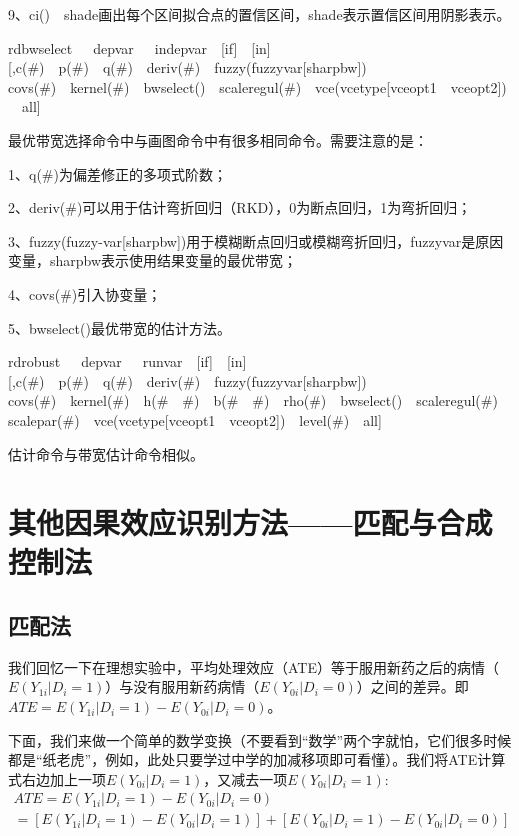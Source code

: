 \documentclass[cn,10pt,math=newtx,citestyle=gb7714-2015,bibstyle=gb7714-2015]{elegantbook}
\begin{document}
	9、ci()~~shade画出每个区间拟合点的置信区间，shade表示置信区间用阴影表示。
	
	rdbwselect~~~depvar~~~indepvar~~[if]~~[in][,c(\#)~~p(\#)~~q(\#)~~deriv(\#)~~fuzzy(fuzzyvar[sharpbw])~~\\
	covs(\#)~~kernel(\#)~~bwselect()~~scaleregul(\#)~~vce(vcetype[vceopt1~~vceopt2])~~all]
	
	最优带宽选择命令中与画图命令中有很多相同命令。需要注意的是：
	
	1、q(\#)为偏差修正的多项式阶数；
	
	2、deriv(\#)可以用于估计弯折回归（RKD），0为断点回归，1为弯折回归；
	
	3、fuzzy(fuzzy-var[sharpbw])用于模糊断点回归或模糊弯折回归，fuzzyvar是原因变量，sharpbw表示使用结果变量的最优带宽；
	
	4、covs(\#)引入协变量；
	
	5、bwselect()最优带宽的估计方法。
	
	rdrobust~~~depvar~~~runvar~~[if]~~[in][,c(\#)~~p(\#)~~q(\#)~~deriv(\#)~~fuzzy(fuzzyvar[sharpbw])~~\\
	covs(\#)~~kernel(\#)~~h(\#~~\#)~~b(\#~~\#)~~rho(\#)~~bwselect()~~scaleregul(\#)~~\\
	scalepar(\#)~~vce(vcetype[vceopt1~~vceopt2])~~level(\#)~~all]
	
	估计命令与带宽估计命令相似。
	
	
	\section{其他因果效应识别方法——匹配与合成控制法}
	
	\subsection{匹配法}
	
	我们回忆一下在理想实验中，平均处理效应（ATE）等于服用新药之后的病情（$E(Y_{1i}\big|D_i=1)$）与没有服用新药病情（$E(Y_{0i}\big|D_i=0)$）之间的差异。即
	$ATE=E(Y_{1i}\big|D_i=1)-E(Y_{0i}\big|D_i=0)$。
	
	下面，我们来做一个简单的数学变换（不要看到“数学”两个字就怕，它们很多时候都是“纸老虎”，例如，此处只要学过中学的加减移项即可看懂）。我们将ATE计算式右边加上一项$E(Y_{0i}\big|D_i=1)$，又减去一项$E(Y_{0i}\big|D_i=1)$:
	\begin{gather}
		ATE=E(Y_{1i}\big|D_i=1)-E(Y_{0i}\big|D_i=0)\nonumber\\
		=[E(Y_{1i}\big|D_i=1)-E(Y_{0i}\big|D_i=1)]+[E(Y_{0i}\big|D_i=1)-E(Y_{0i}\big|D_i=0)]
	\end{gather}
	
\end{document}
